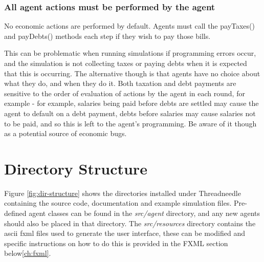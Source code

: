 \documentclass[10pt,oneside,openright, a4paper]{memoir}
\begin{document}
\subsection{All agent actions must be performed by the agent}
No economic actions are performed by default. Agents must call the
payTaxes() and payDebts() methods each step if they wish to pay
those bills.
\par
This can be problematic when running simulations if programming errors occur, 
and the simulation
is not collecting taxes or paying debts when it is expected that this
is occurring. The alternative though is that agents have no choice about
what they do, and when they do it. Both taxation and debt payments
are sensitive to the order of evaluation of actions by the agent in 
each round, for example - for example, salaries being paid before debts are
settled may cause the agent to default on a debt payment, debts before
salaries may cause salaries not to be paid, and so this is
left to the agent's programming. Be aware of it though as a potential
source of economic bugs.
\chapter{Directory Structure}

Figure \ref{fig:dir-structure} shows the directories installed
under Threadneedle containing the source code, documentation
and example simulation files.  Pre-defined agent classes can be found
in the \emph{src/agent} directory, and any new agents 
should also be placed in that directory. The \emph{src/resources} directory
contains the ascii fxml files used to generate the user interface,
these can be modified and specific instructions on how to do
this is provided in the FXML section below\ref{ch:fxml}.
\end{document}
